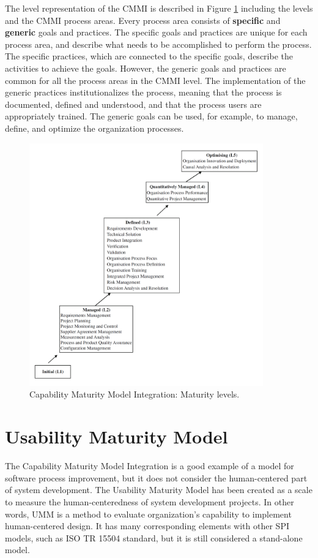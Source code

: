 \documentclass[12pt,a4paper,oneside,pdftex]{report}
\begin{document}
The level representation of the CMMI is described in Figure \ref{fig:cmmi} including the levels and the CMMI process areas. Every process area consists of \textbf{specific} and \textbf{generic} goals and practices. The specific goals and practices are unique for each process area, and describe what needs to be accomplished to perform the process. The specific practices, which are connected to the specific goals, describe the activities to achieve the goals. However, the generic goals and practices are common for all the process areas in the CMMI level. The implementation of the generic practices institutionalizes the process, meaning that the process is documented, defined and understood, and that the process users are appropriately trained. The generic goals can be used, for example, to manage, define, and optimize the organization processes.\citep{RefWorks:29}	

\begin{figure}[H]
  	\centering
  	\includegraphics[width=0.9\textwidth]{./images/cmmi_levels.png}
  	\caption{Capability Maturity Model Integration: Maturity levels. \citep{RefWorks:29}}
	\label{fig:cmmi}
\end{figure}



\section{Usability Maturity Model}
The Capability Maturity Model Integration is a good example of a model for software process improvement, but it does not consider the human-centered part of system development. The Usability Maturity Model has been created as a scale to measure the human-centeredness of system development projects. In other words, UMM is a method to evaluate organization's capability to implement human-centered design. It has many corresponding elements with other SPI models, such as ISO TR 15504 standard, but it is still considered a stand-alone model. \citep{RefWorks:30}	
\end{document}
